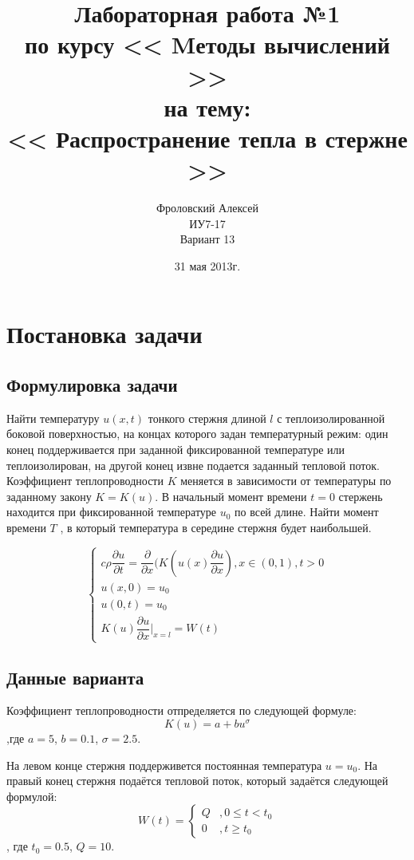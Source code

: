 \documentclass[a4paper,12pt]{report}
\author{Фроловский Алексей \\ ИУ7-17 \\ Вариант 13}
\title{Лабораторная работа №1 \\ по курсу << Mетоды вычислений >>  \\ на тему: \\  
<< Распространение тепла в стержне >> }
\date{31 мая 2013г.}
\begin{document}
\maketitle

\chapter{Постановка задачи}
\section{Формулировка задачи}
Найти температуру $u(x, t)$ тонкого стержня длиной $l$ с теплоизолированной боковой поверхностью, 
на концах которого задан температурный режим: один конец поддерживается при заданной
фиксированной температуре или теплоизолирован, на другой конец извне подается заданный 
тепловой поток. Коэффициент теплопроводности $K$ меняется в зависимости от температуры по 
заданному закону $K = K(u)$. В начальный момент времени $t = 0$ стержень находится при фиксированной
температуре $u_{0}$ по всей длине. Найти момент времени $T$ , в который температура в середине 
стержня будет наибольшей.

\begin{displaymath}
	\left\{
		\begin{array}{l}
			c \rho \dfrac{\partial u}{\partial t}=\dfrac{\partial}{\partial x}(K(u(x)\dfrac{\partial u}{\partial x}), x \in (0, 1), t > 0 \\
			u(x, 0) = u_{0}  \\
			u(0, t) =  u_{0}  \\
			K(u) \dfrac{\partial u}{\partial x} \vert_{x = l} = W(t)
		\end{array} \right.
\end{displaymath}

\section{Данные варианта}
Коэффициент теплопроводности отпределяется по следующей формуле:
\begin{equation}
	K(u) = a + bu^{\sigma}
\end{equation}
,где $a = 5$, $b= 0.1$, $\sigma=2.5$.

На левом конце стержня поддерживется постоянная температура $u = u_{0}$. На правый конец стержня подаётся тепловой 
поток, который задаётся следующей формулой:
\begin{displaymath}
	W(t) = \left\{
		\begin{array}{ll}
			Q & ,0 \le t <  t_{0} \\
			0 & ,t \ge t_{0}
		\end{array} \right.
\end{displaymath}
, где $t_{0} = 0.5$, $Q = 10$.
\end{document}
